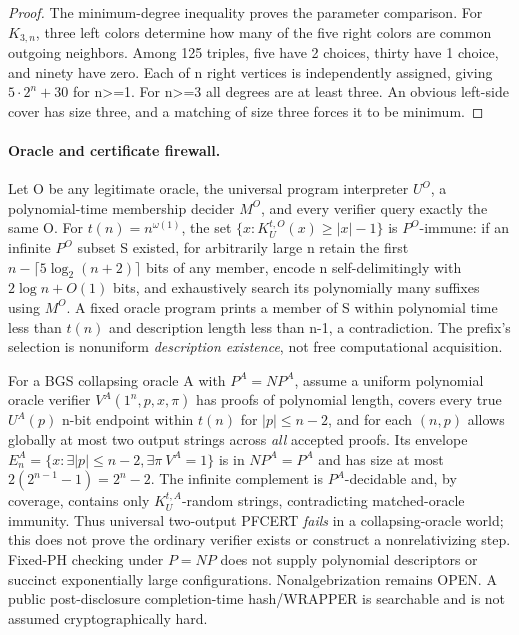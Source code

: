\documentclass[11pt]{article}
\begin{document}
\begin{proof}
The minimum-degree inequality proves the parameter comparison. For $K_{3,n}$, three left colors determine how many of the five right colors are common outgoing neighbors. Among 125 triples, five have 2 choices, thirty have 1 choice, and ninety have zero. Each of n right vertices is independently assigned, giving $5\cdot 2^n+30$ for n>=1. For n>=3 all degrees are at least three. An obvious left-side cover has size three, and a matching of size three forces it to be minimum.
\end{proof}

\paragraph{Oracle and certificate firewall.}
Let O be any legitimate oracle, the universal program interpreter $U^O$, a polynomial-time membership decider $M^O$, and every verifier query exactly the same O. For $t(n)=n^{\omega(1)}$, the set $\{x:K_U^{t,O}(x)\ge|x|-1\}$ is $P^O$-immune: if an infinite $P^O$ subset S existed, for arbitrarily large n retain the first $n-\lceil 5\log_2(n+2)\rceil$ bits of any member, encode n self-delimitingly with $2\log n+O(1)$ bits, and exhaustively search its polynomially many suffixes using $M^O$. A fixed oracle program prints a member of S within polynomial time less than $t(n)$ and description length less than n-1, a contradiction. The prefix's selection is nonuniform \emph{description existence}, not free computational acquisition.

For a BGS collapsing oracle A with $P^A=NP^A$, assume a uniform polynomial oracle verifier $V^A(1^n,p,x,\pi)$ has proofs of polynomial length, covers every true $U^A(p)$ n-bit endpoint within $t(n)$ for $|p|\le n-2$, and for each $(n,p)$ allows globally at most two output strings across \emph{all} accepted proofs. Its envelope $E_n^A=\{x:\exists |p|\le n-2,\exists\pi\ V^A=1\}$ is in $NP^A=P^A$ and has size at most $2(2^{n-1}-1)=2^n-2$. The infinite complement is $P^A$-decidable and, by coverage, contains only $K_U^{t,A}$-random strings, contradicting matched-oracle immunity. Thus universal two-output PFCERT \emph{fails} in a collapsing-oracle world; this does not prove the ordinary verifier exists or construct a nonrelativizing step. Fixed-PH checking under $P=NP$ does not supply polynomial descriptors or succinct exponentially large configurations. Nonalgebrization remains OPEN. A public post-disclosure completion-time hash/WRAPPER is searchable and is not assumed cryptographically hard.
\end{document}
